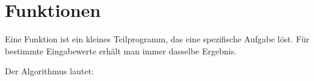 \section{Funktionen}

Eine Funktion ist ein kleines Teilprogramm, das eine spezifische Aufgabe löst. Für bestimmte Eingabewerte erhält man immer dasselbe Ergebnis.

Der Algorithmus lautet:

